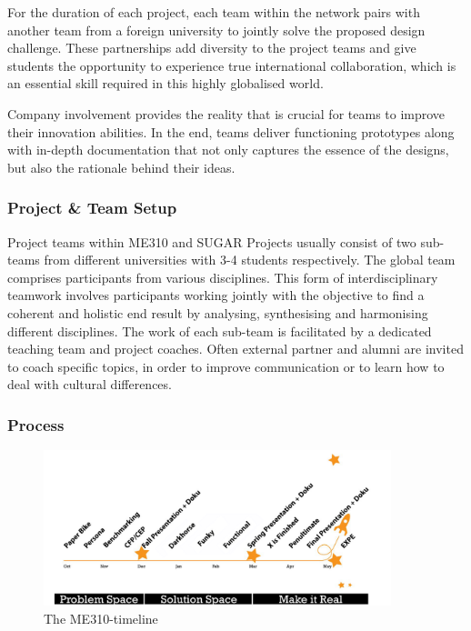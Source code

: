 For the duration of each project, each team within the network pairs with another team from a foreign university to jointly solve the proposed design challenge. These partnerships add diversity to the project teams and give students the opportunity to experience true international collaboration, which is an essential skill required in this highly globalised world.

Company involvement provides the reality that is crucial for teams to improve their innovation abilities. In the end, teams deliver functioning prototypes along with in-depth documentation that not only captures the essence of the designs, but also the rationale behind their ideas.

\subsubsection{Project \& Team Setup}

Project teams within ME310 and SUGAR Projects usually consist of two sub-teams from different universities with 3-4 students respectively. The global team comprises participants from various disciplines. This form of interdisciplinary teamwork involves participants working jointly with the objective to find a coherent and holistic end result by analysing, synthesising and harmonising different disciplines. 
The work of each sub-team is facilitated by a dedicated teaching team and project coaches. Often external partner and alumni are invited to coach specific topics, in order to improve communication or to learn how to deal with cultural differences. 

\subsubsection{Process}

\begin{figure}
  \centering
   \includegraphics[width=0.9\textwidth]{Figures/ChapterContext/me310_timeline}
   \caption{The ME310-timeline}
  \label{fig:me310_timeline}
\end{figure}

